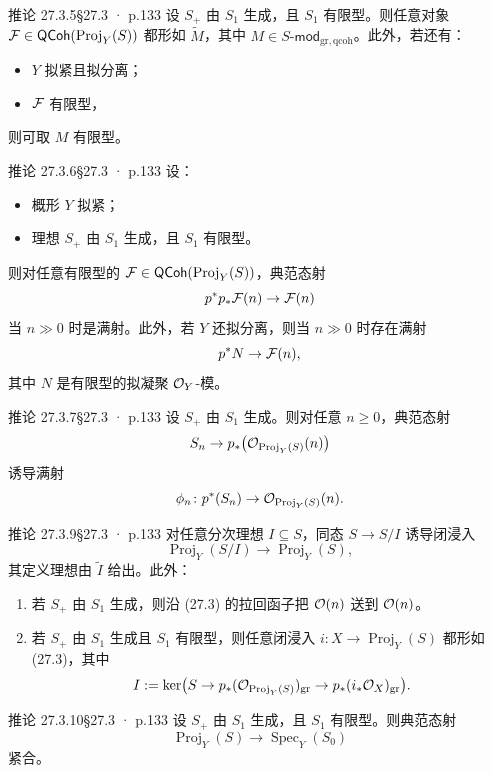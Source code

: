 \documentclass[UTF8,10pt,fontset=windows]{ctexart}
\newcommand{\Spec}{\operatorname{Spec}}\newcommand{\Spm}{\operatorname{Spm}}
\newcommand{\Proj}{\operatorname{Proj}}\newcommand{\Spv}{\operatorname{Spv}}
\providecommand{\QCoh}{\mathsf{QCoh}}
\begin{document}
\begin{card}{推论 27.3.5}{§27.3 · p.133}
设 $S_+$ 由 $S_1$ 生成，且 $S_1$ 有限型。则任意对象 $\cF \in \QCoh(\Proj_Y(S))$ 都形如 $\widetilde{M}$，其中 $M \in S\text{-}\mathsf{mod}_{\mathrm{gr},\mathrm{qcoh}}$。此外，若还有：
\begin{itemize}[leftmargin=2em,itemsep=0.25ex]
  \item $Y$ 拟紧且拟分离；
  \item $\mathcal{F}$ 有限型，
\end{itemize}
则可取 $M$ 有限型。
\end{card}
\begin{card}{推论 27.3.6}{§27.3 · p.133}
设：
\begin{itemize}[leftmargin=2em,itemsep=0.25ex]
  \item 概形 $Y$ 拟紧；
  \item 理想 $S_+$ 由 $S_1$ 生成，且 $S_1$ 有限型。
\end{itemize}
则对任意有限型的 $\cF \in \QCoh(\Proj_Y(S))$，典范态射
\[
p^* p_*\mathcal{F}(n) \to \mathcal{F}(n)
\]
当 $n \gg 0$ 时是满射。此外，若 $Y$ 还拟分离，则当 $n \gg 0$ 时存在满射
\[
p^* N \to \mathcal{F}(n),
\]
其中 $N$ 是有限型的拟凝聚 $\mathcal{O}_Y$-模。
\end{card}
\begin{card}{推论 27.3.7}{§27.3 · p.133}
设 $S_+$ 由 $S_1$ 生成。则对任意 $n \ge 0$，典范态射
\[
S_n \to p_*\bigl(\cO_{\Proj_Y(S)}(n)\bigr)
\]
诱导满射
\[
\phi_n \colon p^* (S_n) \to \cO_{\Proj_Y(S)}(n).
\]
\end{card}
\begin{card}{推论 27.3.9}{§27.3 · p.133}
对任意分次理想 $I \subseteq S$，同态 $S \to S/I$ 诱导闭浸入
\begin{equation}
\Proj_Y(S/I) \to \Proj_Y(S),
\end{equation}
其定义理想由 $\widetilde{I}$ 给出。此外：
\begin{enumerate}[label=(\arabic*),leftmargin=2.4em,itemsep=0.25ex]
  \item 若 $S_+$ 由 $S_1$ 生成，则沿 (27.3) 的拉回函子把 $\mathcal{O}(n)$ 送到 $\mathcal{O}(n)$。
  \item 若 $S_+$ 由 $S_1$ 生成且 $S_1$ 有限型，则任意闭浸入 $i \colon X \to \Proj_Y(S)$ 都形如 (27.3)，其中
  \[
  I := \ker\bigl(S \to p_*(\cO_{\Proj_Y(S)})_{\mathrm{gr}} \to p_*(i_*\cO_X)_{\mathrm{gr}}\bigr).
  \]
\end{enumerate}
\end{card}
\begin{card}{推论 27.3.10}{§27.3 · p.133}
设 $S_+$ 由 $S_1$ 生成，且 $S_1$ 有限型。则典范态射
\[
\Proj_Y(S) \to \Spec_Y(S_0)
\]
紧合。
\end{card}
\end{document}
